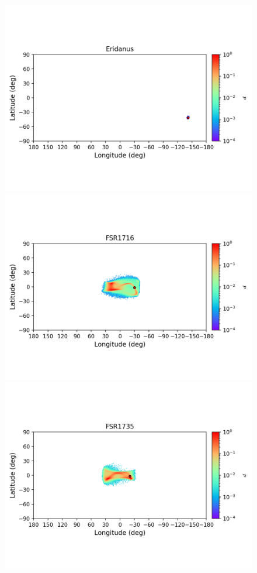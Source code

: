 \begin{figure}
\begin{center}
                \includegraphics[clip=true, trim = 0mm 20mm 0mm 10mm, width=1\columnwidth]{images/error_plots_Eridanus.png}
                \includegraphics[clip=true, trim = 0mm 20mm 0mm 10mm, width=1\columnwidth]{images/error_plots_FSR1716.png}
                \includegraphics[clip=true, trim = 0mm 20mm 0mm 10mm, width=1\columnwidth]{images/error_plots_FSR1735.png}

\end{center}
\end{figure}
